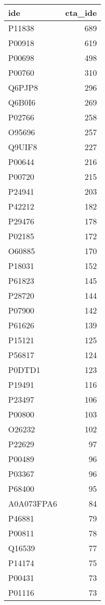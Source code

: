 \documentclass[
]{book}
\begin{document}
\begin{table}[H]
\centering
\begin{tabular}{l|r}
\hline
ide & cta\_ide\\
\hline
P11838 & 689\\
\hline
P00918 & 619\\
\hline
P00698 & 498\\
\hline
P00760 & 310\\
\hline
Q6PJP8 & 296\\
\hline
Q6B0I6 & 269\\
\hline
P02766 & 258\\
\hline
O95696 & 257\\
\hline
Q9UIF8 & 227\\
\hline
P00644 & 216\\
\hline
P00720 & 215\\
\hline
P24941 & 203\\
\hline
P42212 & 182\\
\hline
P29476 & 178\\
\hline
P02185 & 172\\
\hline
O60885 & 170\\
\hline
P18031 & 152\\
\hline
P61823 & 145\\
\hline
P28720 & 144\\
\hline
P07900 & 142\\
\hline
P61626 & 139\\
\hline
P15121 & 125\\
\hline
P56817 & 124\\
\hline
P0DTD1 & 123\\
\hline
P19491 & 116\\
\hline
P23497 & 106\\
\hline
P00800 & 103\\
\hline
O26232 & 102\\
\hline
P22629 & 97\\
\hline
P00489 & 96\\
\hline
P03367 & 96\\
\hline
P68400 & 95\\
\hline
A0A073FPA6 & 84\\
\hline
P46881 & 79\\
\hline
P00811 & 78\\
\hline
Q16539 & 77\\
\hline
P14174 & 75\\
\hline
P00431 & 73\\
\hline
P01116 & 73\\

\end{tabular}
\end{table}
\end{document}
